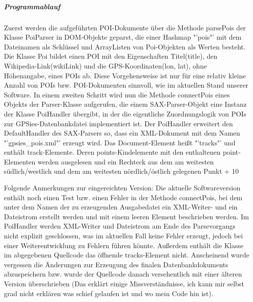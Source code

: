 \subparagraph{Programmablauf}
Zuerst werden die aufgeführten POI-Dokumente über die Methode parsePois der Klasse PoiParser in DOM-Objekte geparst, die einer Hashmap "'pois"' mit dem Dateinamen als Schlüssel und ArrayListen von Poi-Objekten als Werten besteht. Die Klasse Poi bildet einen POI mit den Eigenschaften Titel(title), den Wikipedia-Link(wikiLink) und die GPS-Koordinaten(lon, lat), ohne Höhenangabe, eines POIs ab. Diese Vorgehensweise ist nur für eine relativ kleine Anzahl von POIs bzw. POI-Dokumenten sinnvoll, wie im aktuellen Stand unserer Software.
In einem zweiten Schritt wird nun die Methode connectPois eines Objekts der Parser-Klasse aufgerufen, die einem SAX-Parser-Objekt eine Instanz der Klasse PoiHandler übergibt, in der die eigentliche Zuordnungslogik von POIs zur GPSies-Datenbankdatei implementiert ist. 
Der PoiHandler erweitert den DefaultHandler des SAX-Parsers so, dass ein XML-Dokument mit dem Namen "'gpsies_pois.xml"' erzeugt wird. Das Document-Element heißt "'tracks"' und enthält track-Elemente. Deren points-Kindelemente mit den enthaltenen point-Elementen werden ausgelesen und ein Rechteck aus dem am weitesten südlich/westlich und dem am weitesten nördlich/östlich gelegenen Punkt + 10%

Folgende Anmerkungen zur eingereichten Version: Die aktuelle Softwareversion enthält noch einen Test bzw. einen Fehler in der Methode connectPois, bei dem unter dem Namen der zu erzeugenden Ausgabedatei ein XML-Writer- und ein Dateistrom erstellt werden und mit einem leeren Element beschrieben werden. Im PoiHandler werden XML-Writer und Dateistrom am Ende des Parsevorgangs nicht explizit geschlossen, was im aktuellen Fall keine Fehler erzeugt, jedoch bei einer Weiterentwicklung zu Fehlern führen könnte. Außerdem enthält die Klasse im abgegebenen Quellcode das öffnende tracks-Element nicht. Anscheinend wurde vergessen die Änderungen zur Erzeugung des finalen Datenbankdokuments abzuspeichern bzw. wurde der Quellcode danach versehentlich mit einer älteren Version überschrieben (Das erklärt einige Missverständnisse, ich kann mir selbst grad nicht erklären was schief gelaufen ist und wo mein Code hin ist).